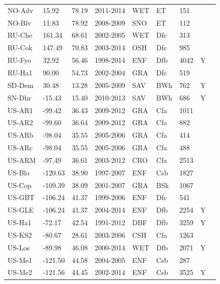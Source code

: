 \documentclass{myreport}
\begin{document}
\begin{longtable}{lllllllll}
  NO-Adv & 15.92 & 78.19 & 2011-2014 & WET & ET & 151 &  & \cite{NO-Adv} \\ 
  NO-Blv & 11.83 & 78.92 & 2008-2009 & SNO & ET & 112 &  & \cite{NO-Blv} \\ 
  RU-Che & 161.34 & 68.61 & 2002-2005 & WET & Dfc & 313 &  & \cite{RU-Che} \\ 
  RU-Cok & 147.49 & 70.83 & 2003-2014 & OSH & Dfc & 985 &  & \cite{RU-Cok} \\ 
  RU-Fyo & 32.92 & 56.46 & 1998-2014 & ENF & Dfb & 4042 & Y & \cite{RU-Fyo} \\ 
  RU-Ha1 & 90.00 & 54.73 & 2002-2004 & GRA & Dfc & 519 &  & \cite{RU-Ha1} \\ 
  SD-Dem & 30.48 & 13.28 & 2005-2009 & SAV & BWh & 762 & Y & \cite{SD-Dem} \\ 
  SN-Dhr & -15.43 & 15.40 & 2010-2013 & SAV & BWh & 686 & Y & \cite{SN-Dhr} \\ 
  US-AR1 & -99.42 & 36.43 & 2009-2012 & GRA & Cfa & 1011 &  & \cite{US-AR1} \\ 
  US-AR2 & -99.60 & 36.64 & 2009-2012 & GRA & Cfa & 882 &  & \cite{US-AR2} \\ 
  US-ARb & -98.04 & 35.55 & 2005-2006 & GRA & Cfa & 414 &  & \cite{US-ARb} \\ 
  US-ARc & -98.04 & 35.55 & 2005-2006 & GRA & Cfa & 488 &  & \cite{US-ARc} \\ 
  US-ARM & -97.49 & 36.61 & 2003-2012 & CRO & Cfa & 2513 &  & \cite{US-ARM} \\ 
  US-Blo & -120.63 & 38.90 & 1997-2007 & ENF & Csb & 1827 &  & \cite{US-Blo} \\ 
  US-Cop & -109.39 & 38.09 & 2001-2007 & GRA & BSk & 1067 &  & \cite{US-Cop} \\ 
  US-GBT & -106.24 & 41.37 & 1999-2006 & ENF & Dfc & 541 &  & \cite{US-GBT} \\ 
  US-GLE & -106.24 & 41.37 & 2004-2014 & ENF & Dfb & 2254 & Y & \cite{US-GLE} \\ 
  US-Ha1 & -72.17 & 42.54 & 1991-2012 & DBF & Dfb & 3259 & Y & \cite{US-Ha1} \\ 
  US-KS2 & -80.67 & 28.61 & 2003-2006 & CSH & Cfa & 1263 &  & \cite{US-KS2} \\ 
  US-Los & -89.98 & 46.08 & 2000-2014 & WET & Dfb & 2071 & Y & \cite{US-Los} \\ 
  US-Me1 & -121.50 & 44.58 & 2004-2005 & ENF & Csb & 287 &  & \cite{US-Me1} \\ 
  US-Me2 & -121.56 & 44.45 & 2002-2014 & ENF & Csb & 3525 & Y & \cite{US-Me2} \\ 

\end{longtable}
\end{document}
